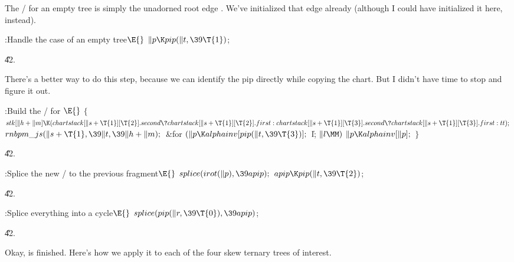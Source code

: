 The \RNBPM/ for an empty tree is simply the unadorned root edge .
We've initialized that edge already (although I could have
initialized it here, instead).

\Y\B\4:Handle the case of an empty tree\X${}\E{}$\6
$\|p\K\\{pip}(\|t,\39\T{1}){}$;\par
\U42.\fi

There's a better way to do this step, because we can identify the pip %
directly while copying the chart. But I didn't have time to
stop and figure it out.

\Y\B\4:Build the \RNBPM/ for \X${}\E{}$\6
${}\{{}$\1\6
${}\\{stk}[\|h+\|m]\K(\\{chartstack}[\|s+\T{1}][\T{2}].\\{second}\?%
\\{chartstack}[\|s+\T{1}][\T{2}].\\{first}:\\{chartstack}[\|s+\T{1}][\T{3}].%
\\{second}\?\\{chartstack}[\|s+\T{1}][\T{3}].\\{first}:\\{tt});{}$\6
${}\\{rnbpm\_js}(\|s+\T{1},\39\|t,\39\|h+\|m);{}$\6
\&{for} ${}(\|p\K\\{alphainv}[\\{pip}(\|t,\39\T{3})];{}$ \|l; ${}\|l\MM){}$\1\5
${}\|p\K\\{alphainv}[\|p];{}$\2\6
\4${}\}{}$\2\par
\U42.\fi

\B{}:Splice the new \RNBPM/ to the previous fragment\X${}\E{}$\6
$\\{splice}(\\{irot}(\|p),\39\\{apip});{}$\6
${}\\{apip}\K\\{pip}(\|t,\39\T{2}){}$;\par
\U42.\fi

\B{}:Splice everything into a cycle\X${}\E{}$\6
$\\{splice}(\\{pip}(\|r,\39\T{0}),\39\\{apip}){}$;\par
\U42.\fi

Okay,  is finished.
Here's how we apply it to each of the four skew ternary
trees of interest.


